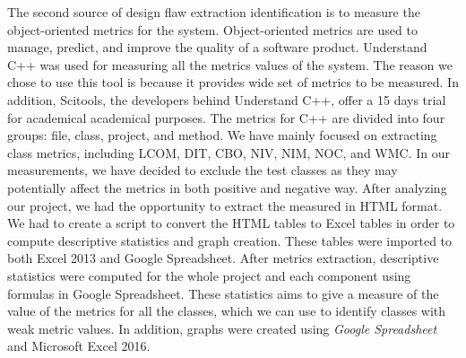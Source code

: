 The second source of design flaw extraction identification is to measure the object-oriented metrics for the system. Object-oriented metrics are used to manage, predict, and improve the quality of a software product\cite{rodriguez2001overview}. Understand C++ was used for measuring all the metrics values of the system. The reason we chose to use this tool is because it provides wide set of metrics to be measured. In addition, Scitools, the developers behind Understand C++, offer a 15 days trial for academical academical purposes. The metrics for C++ are divided into four groups: file, class, project, and method. We have mainly focused on extracting class metrics, including LCOM, DIT, CBO, NIV, NIM, NOC, and WMC. In our measurements, we have decided to exclude the test classes as they may potentially affect the metrics in both positive and negative way. After analyzing our project, we had the opportunity to extract the measured in HTML format. We had to create a script to convert the HTML tables to Excel tables in order to compute descriptive statistics and graph creation. These tables were imported to both Excel 2013 and Google Spreadsheet. After metrics extraction, descriptive statistics were computed for the whole project and each component using formulas in Google Spreadsheet. These statistics aims to give a measure of the value of the metrics for all the classes, which we can use to identify classes with weak metric values. In addition, graphs were created using \textit{Google Spreadsheet} and Microsoft Excel 2016. 

